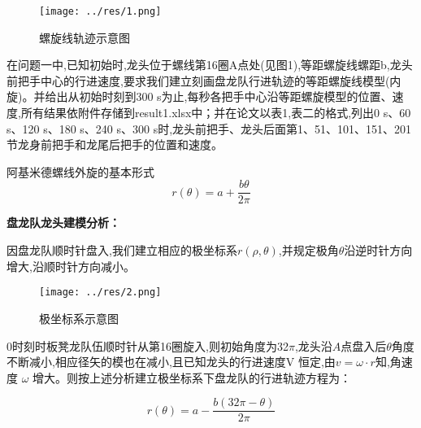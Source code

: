 













\begin{figure}[htbp]
	\centering
		\texttt{[image: ../res/1.png]}
	\caption{螺旋线轨迹示意图}
	\label{fig:螺旋线轨迹示意图}
\end{figure}

在问题一中,已知初始时,龙头位于螺线第16圈A点处(见图1),等距螺旋线螺距b,龙头前把手中心的行进速度,要求我们建立刻画盘龙队行进轨迹的等距螺旋线模型(内旋)。并给出从初始时刻到300 s为止,每秒各把手中心沿等距螺旋模型的位置、速度,所有结果依附件存储到result1.xlsx中；并在论文以表1,表二的格式,列出0 s、60 s、120 s、180 s、240 s、300 s时,龙头前把手、龙头后面第1、51、101、151、201节龙身前把手和龙尾后把手的位置和速度。


阿基米德螺线外旋的基本形式
\begin{equation}
	r(\theta)=  a + \frac{b\theta}{2\pi}
\end{equation}

\textbf{盘龙队龙头建模分析：}

因盘龙队顺时针盘入,我们建立相应的极坐标系$r(\rho,\theta)$,并规定极角$\theta$沿逆时针方向增大,沿顺时针方向减小。

\begin{figure}[htbp]
	\centering
	\texttt{[image: ../res/2.png]}
	\caption{极坐标系示意图}
	\label{fig:极坐标系示意图}
\end{figure}

$0$时刻时板凳龙队伍顺时针从第16圈旋入,则初始角度为32$\pi$,龙头沿$A$点盘入后$\theta$角度不断减小,相应径矢的模也在减小,且已知龙头的行进速度V 恒定,由$v = \omega \cdot r $知,角速度 $\omega$ 增大。则按上述分析建立极坐标系下盘龙队的行进轨迹方程为：

\begin{equation}
	r(\theta) = a - \frac{b(32\pi - \theta)}{2\pi}
\end{equation}

